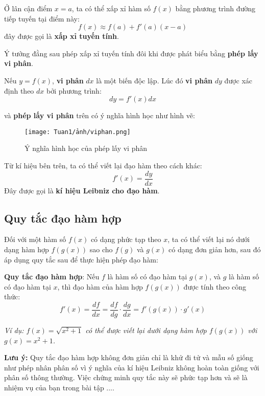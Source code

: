 \begin{definition}
    Ở lân cận điểm $x=a$, ta có thể xấp xỉ hàm số $f(x)$ bằng phương trình đường tiếp tuyến tại điểm này:
\begin{equation}
        f(x)\approx f(a)+f'(a)(x-a)
    \end{equation}
đây được gọi là \textbf{xấp xỉ tuyến tính}.
\end{definition}
Ý tưởng đằng sau phép xấp xỉ tuyến tính đôi khi được phát biểu bằng \textbf{phép lấy vi phân}.

\begin{definition}
    Nếu $y=f(x)$, \textbf{vi phân} $dx$ là một biến độc lập. Lúc đó \textbf{vi phân} $dy$ được xác định theo $dx$ bởi phương trình:
\begin{equation}
    dy=f'(x)dx
\end{equation}
\end{definition}
và \textbf{phép lấy vi phân} trên có ý nghĩa hình học như hình vẽ:

\begin{figure}[H]
\centering
\texttt{[image: Tuan1/ảnh/viphan.png]}
\caption{Ý nghĩa hình học của phép lấy vi phân}
\end{figure}
Từ kí hiệu bên trên, ta có thể viết lại đạo hàm theo cách khác:
\begin{equation}
    f'(x)=\frac{dy}{dx} 
\end{equation}
Đây được gọi là \textbf{kí hiệu Leibniz cho đạo hàm}.
\subsection{Quy tắc đạo hàm hợp}

Đối với một hàm số \(f(x)\) có dạng phức tạp theo \(x\), ta có thể viết lại nó dưới dạng hàm hợp \(f(g(x))\) sao cho \(f(g)\) và \(g(x)\) có dạng đơn giản hơn, sau đó áp dụng quy tắc sau để thực hiện phép đạo hàm:
\begin{theorem}
\textbf{Quy tắc đạo hàm hợp}: Nếu \(f\) là hàm số có đạo hàm tại \(g(x)\), và \(g\) là hàm số có đạo hàm tại \(x\), thì đạo hàm của hàm hợp \(f(g(x))\) được tính theo công thức:
\begin{equation}
    f'(x)=\frac{df}{dx}=\frac{df}{dg}\cdot\frac{dg}{dx}=f'(g(x))\cdot g'(x)
\end{equation}
\end{theorem}
\textit{Ví dụ: \(f(x)=\sqrt{x^2+1}\) có thể được viết lại dưới dạng hàm hợp \(f(g(x))\) với \(g(x)=x^2+1\).}

\textbf{Lưu ý:} Quy tắc đạo hàm hợp không đơn giản chỉ là khử đi tử và mẫu số giống như phép nhân phân số vì ý nghĩa của kí hiệu Leibniz không hoàn toàn giống với phân số thông thường. Việc chứng minh quy tắc này sẽ phức tạp hơn và sẽ là nhiệm vụ của bạn trong bài tập ....
